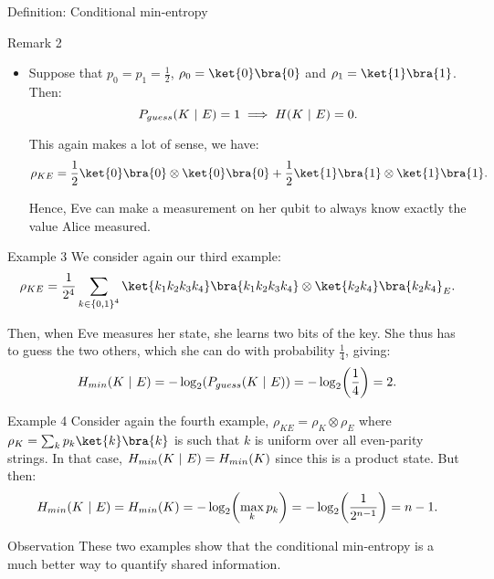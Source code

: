 \documentclass[a4paper]{article}
\begin{document}
\begin{parag}{Definition: Conditional min-entropy}
\begin{subparag}{Remark 2}
\begin{itemize}[left=0pt]
            This makes sense since, taking a trace on both sides of $p_0 \rho_0 = p_1 \rho_1$, this tells us that $p_0 = p_1$ and thus $\rho_0 = \rho_1$. Hence, by our first remark, we are back to $H\left(K \suchthat E\right) = H\left(K\right)$. Since moreover $p_0 = p_1$ means that $p_0 = p_1 = \frac{1}{2}$, this shows exactly that $H\left(K \suchthat E\right) = H\left(K\right) = 1$.
            \item Suppose that $p_0 = p_1 = \frac{1}{2}$, $\rho_0 = \ket{0}\bra{0}$ and $\rho_1 = \ket{1}\bra{1}$. Then: 
            \[P_{guess}\left(K \suchthat E\right) = 1 \implies H\left(K \suchthat E\right) = 0.\]
            
            This again makes a lot of sense, we have: 
            \[\rho_{KE} = \frac{1}{2} \ket{0}\bra{0} \otimes \ket{0}\bra{0} + \frac{1}{2} \ket{1}\bra{1}\otimes \ket{1}\bra{1}.\]
            
            Hence, Eve can make a measurement on her qubit to always know exactly the value Alice measured.
        \end{itemize}
    \end{subparag}
\end{parag}

\begin{parag}{Example 3}
    We consider again our third example: 
    \[\rho_{KE} = \frac{1}{2^4} \sum_{k \in \left\{0, 1\right\}^4} \ket{k_1 k_2 k_3 k_4}\bra{k_1 k_2 k_3 k_4} \otimes \ket{k_2 k_4}\bra{k_2 k_4}_E.\]
    
    Then, when Eve measures her state, she learns two bits of the key. She thus has to guess the two others, which she can do with probability $\frac{1}{4}$, giving:
    \[H_{min}\left(K \suchthat E\right) = -\log_2\left(P_{guess}\left(K \suchthat E\right)\right) = -\log_2\left(\frac{1}{4}\right) = 2.\]
\end{parag}

\begin{parag}{Example 4}
    Consider again the fourth example, $\rho_{KE} = \rho_K \otimes \rho_E$ where $\rho_K = \sum_{k} p_k \ket{k}\bra{k}$ is such that $k$ is uniform over all even-parity strings. In that case, $H_{min}\left(K \suchthat E\right) = H_{min}\left(K\right)$  since this is a product state. But then: 
    \[H_{min}\left(K \suchthat E\right) = H_{min}\left(K\right) = -\log_2\left(\max_k p_k\right) = -\log_2\left(\frac{1}{2^{n-1}}\right) = n-1.\]

    \begin{subparag}{Observation}
        These two examples show that the conditional min-entropy is a much better way to quantify shared information.
    \end{subparag}
\end{parag}
\end{document}
